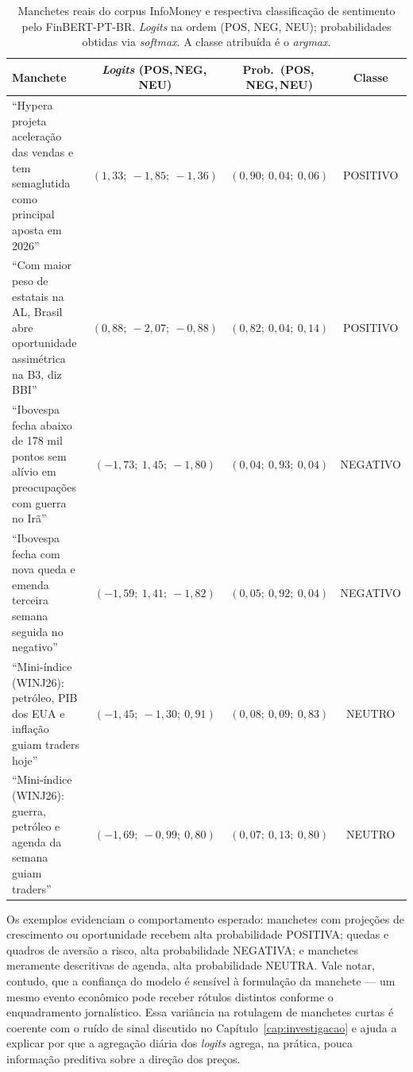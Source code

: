 \begin{table}[htb]
\centering
\caption{Manchetes reais do corpus InfoMoney e respectiva classificação de sentimento pelo FinBERT-PT-BR. \textit{Logits} na ordem (POS, NEG, NEU); probabilidades obtidas via \textit{softmax}. A classe atribuída é o \textit{argmax}.}\label{tab:exemplos_artigos}
\footnotesize
\begin{tabularx}{\textwidth}{Xccc}
\toprule
\textbf{Manchete} & \textbf{\textit{Logits} (POS,\,NEG,\,NEU)} & \textbf{Prob.\ (POS,\,NEG,\,NEU)} & \textbf{Classe} \\
\midrule
``Hypera projeta aceleração das vendas e tem semaglutida como principal aposta em 2026'' & $(1{,}33;\ -1{,}85;\ -1{,}36)$ & $(0{,}90;\ 0{,}04;\ 0{,}06)$ & POSITIVO \\
\addlinespace
``Com maior peso de estatais na AL, Brasil abre oportunidade assimétrica na B3, diz BBI'' & $(0{,}88;\ -2{,}07;\ -0{,}88)$ & $(0{,}82;\ 0{,}04;\ 0{,}14)$ & POSITIVO \\
\addlinespace
``Ibovespa fecha abaixo de 178 mil pontos sem alívio em preocupações com guerra no Irã'' & $(-1{,}73;\ 1{,}45;\ -1{,}80)$ & $(0{,}04;\ 0{,}93;\ 0{,}04)$ & NEGATIVO \\
\addlinespace
``Ibovespa fecha com nova queda e emenda terceira semana seguida no negativo'' & $(-1{,}59;\ 1{,}41;\ -1{,}82)$ & $(0{,}05;\ 0{,}92;\ 0{,}04)$ & NEGATIVO \\
\addlinespace
``Mini-índice (WINJ26): petróleo, PIB dos EUA e inflação guiam traders hoje'' & $(-1{,}45;\ -1{,}30;\ 0{,}91)$ & $(0{,}08;\ 0{,}09;\ 0{,}83)$ & NEUTRO \\
\addlinespace
``Mini-índice (WINJ26): guerra, petróleo e agenda da semana guiam traders'' & $(-1{,}69;\ -0{,}99;\ 0{,}80)$ & $(0{,}07;\ 0{,}13;\ 0{,}80)$ & NEUTRO \\
\bottomrule
\end{tabularx}
\end{table}

Os exemplos evidenciam o comportamento esperado: manchetes com projeções de crescimento ou oportunidade recebem alta probabilidade POSITIVA; quedas e quadros de aversão a risco, alta probabilidade NEGATIVA; e manchetes meramente descritivas de agenda, alta probabilidade NEUTRA. Vale notar, contudo, que a confiança do modelo é sensível à formulação da manchete --- um mesmo evento econômico pode receber rótulos distintos conforme o enquadramento jornalístico. Essa variância na rotulagem de manchetes curtas é coerente com o ruído de sinal discutido no Capítulo~\ref{cap:investigacao} e ajuda a explicar por que a agregação diária dos \textit{logits} agrega, na prática, pouca informação preditiva sobre a direção dos preços.
